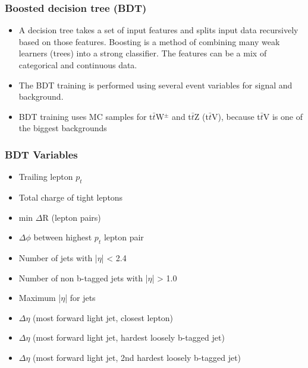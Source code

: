 \documentclass[11pt]{beamer}
\begin{document}
\begin{frame}
\frametitle{Boosted decision tree (BDT)}
\begin{itemize}
\item A decision tree takes a set of input features and splits input data recursively based on
those features.
Boosting is a method of combining many weak learners (trees) into a strong classifier. The features can be a mix of categorical and continuous data.
\item The BDT training is performed using several event variables for signal and background. 
	\item BDT training uses MC samples for  t$\bar{t}$W$^\pm$ and t$\bar{t}$Z (t$\bar{t}$V),
	because t$\bar{t}$V is one of the biggest backgrounds
\end{itemize}
\end{frame}


\begin{frame}
\frametitle{BDT Variables}
\begin{itemize}
\item	Trailing lepton $p_{t}$
\item 	Total charge of tight leptons
\item 	min $\Delta$R (lepton pairs)
\item 	$\Delta\phi$ between highest $p_t$ lepton pair
\item 	Number of jets with |$\eta$| < 2.4
\item	Number of non b-tagged jets with |$\eta$| > 1.0
\item	Maximum |$\eta$| for jets
\item	$\Delta\eta$ (most forward light jet, closest lepton)
\item	$\Delta\eta$ (most forward light jet, hardest loosely b-tagged jet)
\item	$\Delta\eta$ (most forward light jet, 2nd hardest loosely b-tagged jet)
\end{itemize}
\end{frame}
\end{document}
